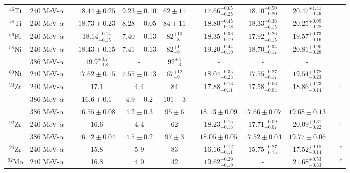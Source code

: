 \begin{table}[t!]
{\begin{tabular}{@{}cccccccccc@{}cc}
$^{46}$Ti & 240 MeV-$\alpha$ & & $18.44\pm0.25$ & $9.23\pm0.10$ & $62\pm11 $ & & ${17.66}^{+0.65}_{-0.25}$ & ${18.10}^{+0.50}_{-0.20}$ & ${20.47}^{+1.41}_{-0.49}$ & & \cite{DHY2006_Ti} \\
$^{48}$Ti & 240 MeV-$\alpha$ & & $18.73\pm0.23$ & $8.28 \pm 0.05$ & $84\pm11 $ & & ${18.80}^{+0.45}_{-0.18}$ & ${18.33}^{+0.36}_{-0.15}$ & ${20.25}^{+0.99}_{-0.28}$ & & \cite{DHY2006_Ti} \\
$^{56}$Fe & 240 MeV-$\alpha$ & & ${18.14}^{+0.14}_{-0.15}$ & $7.40\pm0.13$ & ${82}^{+10}_{-8}$ & & ${18.35}^{+0.33}_{-0.19}$ & ${17.92}^{+0.26}_{-0.15}$ & ${19.57}^{+0.73}_{-0.16}$ & & \cite{DHY2006_mass60} \\
$^{58}$Ni & 240 MeV-$\alpha$ & & $18.43\pm0.15$ & $7.41\pm0.13$ & ${82}^{+11}_{-9}$ & & ${19.20}^{+0.44}_{-0.19}$ & ${18.70}^{+0.34}_{-0.17}$ & ${20.81}^{+0.90}_{-0.28}$ & & \cite{DHY2006_mass60} \\
  & 386 MeV-$\alpha$ & & $19.9^{+0.7}_{-0.8}$ & - & $92^{+4}_{-3}$ & & - & - & - & & \cite{nayak58ni} \\
$^{60}$Ni & 240 MeV-$\alpha$ & & $17.62\pm0.15$ & $7.55\pm0.13$ & ${67}^{+12}_{-9}$ & & ${18.04}^{+0.35}_{-0.23}$ & ${17.55}^{+0.27}_{-0.17}$ & ${19.54}^{+0.78}_{-0.23}$ & & \cite{DHY2006_mass60} \\
$^{90}$Zr & 240 MeV-$\alpha$ & & 17.1 & 4.4 & 84 & & ${17.88}^{+0.13}_{-0.11}$ & ${17.58}^{+0.06}_{-0.04}$ & ${18.86}^{+0.23}_{-0.14}$ & & \cite{Krishi_2015}$^\dagger$ \\
  & 386 MeV-$\alpha$ & & $16.6\pm0.1$ & $4.9\pm0.2$ & $101\pm3$ & & - & - & - & & \cite{Uchida_90Zr} \\	
  & 386 MeV-$\alpha$ & & $16.55\pm0.08$ & $4.2\pm0.3$ & $95\pm6$ & & $18.13\pm0.09$ & $17.66\pm0.07$ & $19.68\pm0.13$ & & \cite{YKGPLB2016} \\
$^{92}$Zr & 240 MeV-$\alpha$ & & 16.6 & 4.4 & 62 & & ${18.23}^{+0.15}_{-0.13}$ & ${17.71}^{+0.09}_{-0.07}$ & ${20.09}^{+0.31}_{-0.22}$ & & \cite{Krishi_2015}$^\dagger$ \\
  & 386 MeV-$\alpha$ & & $16.12\pm0.04$ & $4.5\pm0.2$ & $97\pm3$ & & $18.05\pm0.05$ & $17.52\pm0.04$ & $19.77\pm0.06$ & & \cite{YKGPLB2016} \\
$^{94}$Zr & 240 MeV-$\alpha$ & & 15.8 & 5.9 & 83 & & ${16.16}^{+0.12}_{-0.11}$ & ${15.75}^{+0.27}_{-0.15}$ & ${17.52}^{+0.18}_{-0.14}$ & & \cite{Krishi_2015}$^\dagger$ \\
$^{92}$Mo & 240 MeV-$\alpha$ & & 16.8 & 4.0 & 42 & & ${19.62}^{+0.29}_{-0.19}$ & - & ${21.68}^{+0.53}_{-0.33}$ & & \cite{DHY_2016_AllMo}$^\dagger$ \\					

\end{tabular}}
\end{table}
